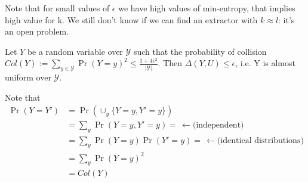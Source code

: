 Note that for small values of $\epsilon$ we have high values of min-entropy, that implies high value for k. We still don't know if we can find an extractor with $k \approx l$: it's an open problem.

\begin{lemma}
    \label{collision probability}
    Let $Y$ be a random variable over $\mathcal{Y}$ such that the probability of collision $Col(Y):= \sum_{\mathit{y} \in \mathcal{Y}} \Pr(Y=\mathit{y})^2 \leq \frac{1 + 4\epsilon^2}{|\mathcal{Y}|}$.
    Then $\Delta(Y, U) \leq \epsilon$, i.e. Y is almost uniform over $\mathcal{Y}$.
\end{lemma}

Note that
\begin{align*}
    \Pr(Y=Y') & = \Pr(\cup_\mathit{y} \{Y= \mathit{y}, Y'= \mathit{y}\})                                                    \\
              & = \sum_{\mathit{y}}\Pr(Y= \mathit{y}, Y'= \mathit{y}) = \, \leftarrow \mbox{(independent)}                  \\
              & = \sum_{\mathit{y}} \Pr(Y= \mathit{y}) \Pr(Y'= \mathit{y}) = \, \leftarrow \mbox{(identical distributions)} \\
              & = \sum_{\mathit{y}} \Pr(Y= \mathit{y})^2                                                                    \\
              & = Col(Y)
\end{align*}

